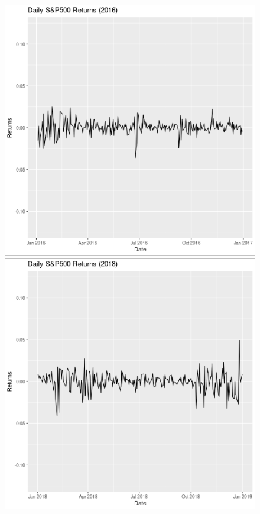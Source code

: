 \documentclass[12pt,letterpaper,reqno,fleqn]{article}
\begin{document}
\begin{figure}
\includegraphics[scale=.5]{plot16}
\includegraphics[scale=.5]{plot18}

\end{figure}
\end{document}
